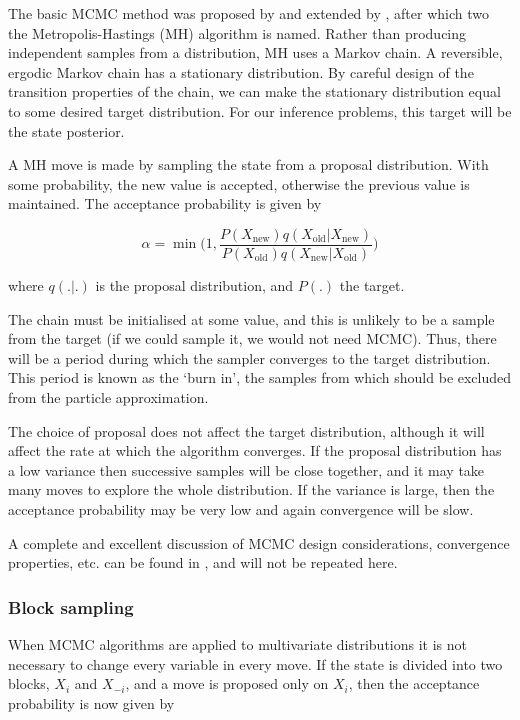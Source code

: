 The basic MCMC method was proposed by \cite{Metropolis1953} and extended by \cite{Hastings1970}, after which two the Metropolis-Hastings (MH) algorithm is named. Rather than producing independent samples from a distribution, MH uses a Markov chain. A reversible, ergodic Markov chain has a stationary distribution. By careful design of the transition properties of the chain, we can make the stationary distribution equal to some desired target distribution. For our inference problems, this target will be the state posterior.

A MH move is made by sampling the state from a proposal distribution. With some probability, the new value is accepted, otherwise the previous value is maintained. The acceptance probability is given by

\begin{equation}
\alpha = \min \bigg ( 1,  \frac{ P(X_{\text{new}}) q(X_{\text{old}}|X_{\text{new}}) }{ P(X_{\text{old}}) q(X_{\text{new}}|X_{\text{old}}) }  \bigg )
\end{equation}

where $q(.|.)$ is the proposal distribution, and $P(.)$ the target.

The chain must be initialised at some value, and this is unlikely to be a sample from the target (if we could sample it, we would not need MCMC). Thus, there will be a period during which the sampler converges to the target distribution. This period is known as the `burn in', the samples from which should be excluded from the particle approximation.

The choice of proposal does not affect the target distribution, although it will affect the rate at which the algorithm converges. If the proposal distribution has a low variance then successive samples will be close together, and it may take many moves to explore the whole distribution. If the variance is large, then the acceptance probability may be very low and again convergence will be slow.

A complete and excellent discussion of MCMC design considerations, convergence properties, etc. can be found in \cite{Gilks1996}, and will not be repeated here.

\subsubsection{Block sampling}
When MCMC algorithms are applied to multivariate distributions it is not necessary to change every variable in every move. If the state is divided into two blocks, $X_i$ and $X_{-i}$, and a move is proposed only on $X_i$, then the acceptance probability is now given by

